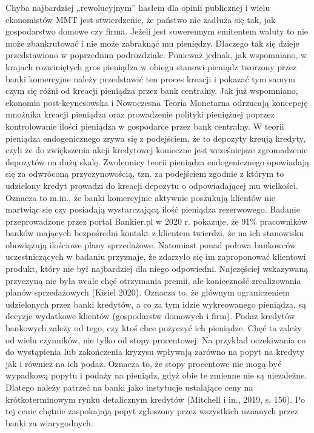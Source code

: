 \documentclass[
]{book}
\begin{document}
Chyba najbardziej „rewolucyjnym'' hasłem dla opinii publicznej i wielu ekonomistów MMT jest stwierdzenie, że państwo nie zadłuża się tak, jak gospodarstwo domowe czy firma. Jeżeli jest suwerennym emitentem waluty to nie może zbankrutować i nie może zabraknąć mu pieniędzy. Dlaczego tak się dzieje przedstawiono w poprzednim podrozdziale. Ponieważ jednak, jak wspomniano, w krajach rozwiniętych gros pieniądza w obiegu stanowi pieniądz tworzony przez banki komercyjne należy przedstawić ten proces kreacji i pokazać tym samym czym się różni od kreacji pieniądza przez bank centralny.
Jak już wspomniano, ekonomia post-keynesowska i Nowoczesna Teoria Monetarna odrzucają koncepcję mnożnika kreacji pieniądza oraz prowadzenie polityki pieniężnej poprzez kontrolowanie ilości pieniądza w gospodarce przez bank centralny. W teorii pieniądza endogenicznego zrywa się z podejściem, że to depozyty kreują kredyty, czyli że do zwiększenia akcji kredytowej konieczne jest wcześniejsze zgromadzenie depozytów na dużą skalę. Zwolennicy teorii pieniądza endogenicznego opowiadają się za odwróconą przyczynowością, tzn. za podejściem zgodnie z którym to udzielony kredyt prowadzi do kreacji depozytu o odpowiadającej mu wielkości. Oznacza to m.in., że banki komercyjnie aktywnie poszukują klientów nie martwiąc się czy posiadają wystarczającą ilość pieniądza rezerwowego. Badanie przeprowadzone przez portal Bankier.pl w 2020 r. pokazuje, że 91\% pracowników banków mających bezpośredni kontakt z klientem twierdzi, że na ich stanowisku obowiązują ilościowe plany sprzedażowe. Natomiast ponad połowa bankowców uczestniczących w badaniu przyznaje, że zdarzyło się im zaproponować klientowi produkt, który nie był najbardziej dla niego odpowiedni. Najczęściej wskazywaną przyczyną nie była wcale chęć otrzymania premii, ale konieczność zrealizowania planów sprzedażowych (Kisiel 2020). Oznacza to, że głównym ograniczeniem udzielonych przez banki kredytów, a co za tym idzie wykreowanego pieniądza, są decyzje wydatkowe klientów (gospodarstw domowych i firm). Podaż kredytów bankowych zależy od tego, czy ktoś chce pożyczyć ich pieniądze. Chęć ta zależy od wielu czynników, nie tylko od stopy procentowej. Na przykład oczekiwania co do wystąpienia lub zakończenia kryzysu wpływają zarówno na popyt na kredyty jak i również na ich podaż. Oznacza to, że stopy procentowe nie mogą być wypadkową popytu i podaży na pieniądz, gdyż obie te zmienne nie są niezależne. Dlatego należy patrzeć na banki jako instytucje ustalające ceny na krótkoterminowym rynku detalicznym kredytów (Mitchell i in., 2019, s. 156). Po tej cenie chętnie zaspokajają popyt zgłoszony przez wszystkich uznanych przez banki za wiarygodnych.
\end{document}
